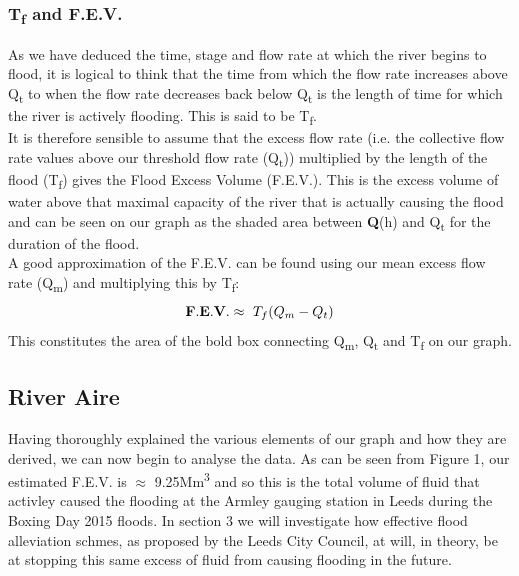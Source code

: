 \documentclass[11 pt, a4paper]{article}
\begin{document}
\subsubsection{T\textsubscript{f} and F.E.V.}
As we have deduced the time, stage and flow rate at which the river begins to flood, it is logical to think that the time from which the flow rate increases above Q\textsubscript{t} to when the flow rate decreases back below Q\textsubscript{t} is the length of time for which the river is actively flooding. This is said to be T\textsubscript{f}.\\ 
It is therefore sensible to assume that the excess flow rate (i.e. the collective flow rate values above our threshold flow rate (Q\textsubscript{t})) multiplied by the length of the flood (T\textsubscript{f}) gives the Flood Excess Volume (F.E.V.). This is the excess volume of water above that maximal capacity of the river that is actually causing the flood and can be seen on our graph as the shaded area between {\bf Q}(h) and Q\textsubscript{t} for the duration of the flood.\\
A good approximation of the F.E.V. can be found using our mean excess flow rate (Q\textsubscript{m}) and multiplying this by T\textsubscript{f}:
\[{\bf F.E.V.}\approx\ T_f (Q_m - Q_t)\]
This constitutes the area of the bold box connecting Q\textsubscript{m}, Q\textsubscript{t} and T\textsubscript{f} on our graph.

\subsection{River Aire}
Having thoroughly explained the various elements of our graph and how they are derived, we can now begin to analyse the data. As can be seen from Figure 1, our estimated F.E.V. is $\approx$ 9.25Mm\textsuperscript{3} and so this is the total volume of fluid that activley caused the flooding at the Armley gauging station in Leeds during the Boxing Day 2015 floods. In section 3 we will investigate how effective flood alleviation schmes, as proposed by the Leeds City Council, at will, in theory, be at stopping this same excess of fluid from causing flooding in the future.
\end{document}
